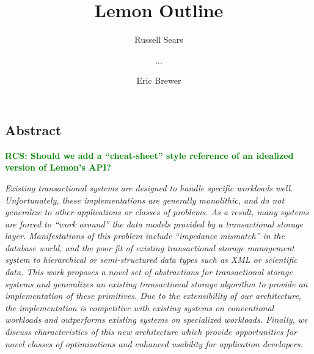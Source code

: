 \documentclass[10pt,letterpaper,twocolumn,english]{article}
\newcommand{\yad}{Lemon\xspace}
\newcommand{\rcs}[1]{\textcolor{green}{\bf RCS: #1}}
\begin{document}
\title{\yad Outline }


\author{Russell Sears \and ... \and Eric Brewer}

\maketitle


\subsection*{Abstract}

\rcs{Should we add a
``cheat-sheet'' style reference of an idealized version of \yad's
API?}

{\em Existing transactional systems are designed to handle specific
workloads well.  Unfortunately, these implementations are generally
monolithic, and do not generalize to other applications or classes of
problems.  As a result, many systems are forced to ``work around'' the
data models provided by a transactional storage layer. Manifestations
of this problem include ``impedance mismatch'' in the database world,
and the poor fit of existing transactional storage management system
to hierarchical or semi-structured data types such as XML or
scientific data.  This work proposes a novel set of abstractions for
transactional storage systems and generalizes an existing
transactional storage algorithm to provide an implementation of these
primitives.  Due to the extensibility of our architecture, the
implementation is competitive with existing systems on conventional
workloads and outperforms existing systems on specialized
workloads.  Finally, we discuss characteristics of this new
architecture which provide opportunities for novel classes of
optimizations and enhanced usability for application developers.}

\end{document}
